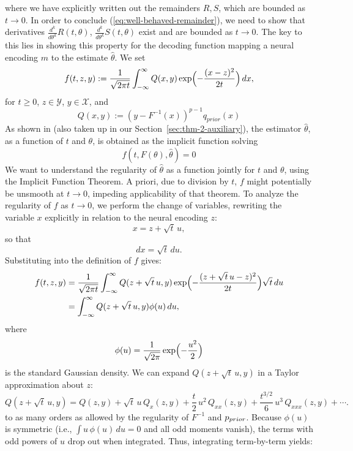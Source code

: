     where we have explicitly written out the remainders $R, S$, which are bounded as $t\rightarrow 0$.
In order to conclude (\ref{eq:well-behaved-remainder}), we need to show that derivatives $\frac{d^k}{d\theta^k} R(t,\theta)$, $\frac{d^k}{d\theta^k} S(t,\theta)$ exist and are bounded as $t \rightarrow 0$.
The key to this lies in showing this property for the decoding function mapping a neural encoding $m$ to the estimate $\widehat{\theta}$.
We set
\[
f(t,z,y) := \frac{1}{\sqrt{2\pi t}} \int_{-\infty}^{\infty} Q(x,y) \exp\Bigl(-\frac{(x-z)^2}{2t}\Bigr) \, dx,
\]
for \(t \geq 0\), \(z \in \mathcal{Y}\), \(y \in \mathcal{X}\), and
\begin{equation}
    Q(x,y) := (y-F^{-1}(x))^{p-1} q_{prior}(x)
\end{equation}
As shown in \citet[][SI Appendix, Proof of Theorem 1]{hahn2024unifying} (also taken up in our Section~\ref{sec:thm-2-auxiliary}), the estimator $\widehat{\theta}$, as a function of $t$ and $\theta$, is obtained as the implicit function solving
\begin{equation}
    f(t,F(\theta), \widehat{\theta}) = 0
\end{equation}
We want to understand the regularity of $\widehat{\theta}$ as a function jointly for $t$ and $\theta$, using the Implicit Function Theorem.
A priori, due to division by $t$, $f$ might potentially be unsmooth at $t\rightarrow 0$, impeding applicability of that theorem.
To analyze the regularity of \(f\) as \(t \to 0\), we perform the change of variables, rewriting the variable $x$ explicitly in relation to the neural encoding $z$:
\[
x = z + \sqrt{t}\, u,
\]
so that
\[
dx = \sqrt{t}\, du.
\]
Substituting into the definition of \(f\) gives:
\[
\begin{aligned}
f(t,z,y) &= \frac{1}{\sqrt{2\pi t}} \int_{-\infty}^{\infty} Q(z+\sqrt{t}\, u,y) \exp\Bigl(-\frac{(z+\sqrt{t}\, u - z)^2}{2t}\Bigr) \sqrt{t}\, du \\
&= \int_{-\infty}^{\infty} Q(z+\sqrt{t}\, u,y) \phi(u)\, du,
\end{aligned}
\]
where
\[
\phi(u)=\frac{1}{\sqrt{2\pi}}\exp\Bigl(-\frac{u^2}{2}\Bigr)
\]
is the standard Gaussian density.
We can expand \(Q(z+\sqrt{t}\, u,y)\) in a Taylor approximation about \(z\):
\[
Q(z+\sqrt{t}\, u,y) = Q(z,y) + \sqrt{t}\, u\, Q_x(z,y) + \frac{t}{2}\, u^2\, Q_{xx}(z,y) + \frac{t^{3/2}}{6}\, u^3\, Q_{xxx}(z,y) + \cdots.
\]
to as many orders as allowed by the regularity of $F^{-1}$ and $p_{prior}$.
Because \(\phi(u)\) is symmetric (i.e., \(\int u\,\phi(u) \,du=0\) and all odd moments vanish), the terms with odd powers of \(u\) drop out when integrated. Thus, integrating term-by-term yields:
